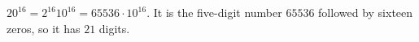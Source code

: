 $20^{16}=2^{16}10^{16}=65536\cdot 10^{16}$. It is the five-digit number $65536$ followed by sixteen zeros, so it has $\boxed{21}$ digits.
